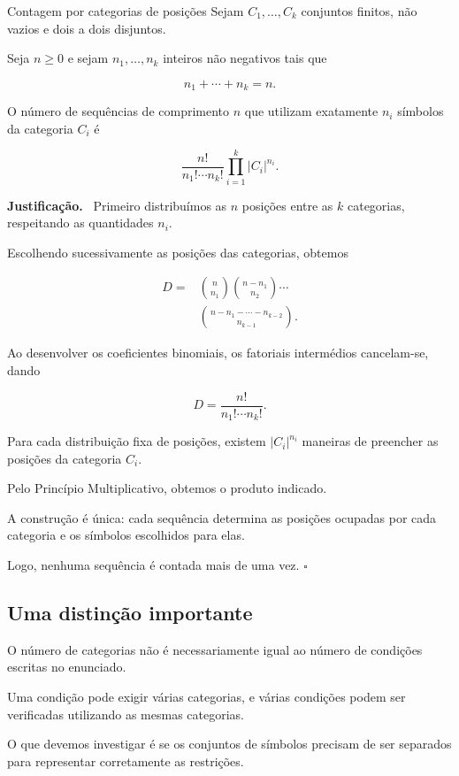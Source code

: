 \documentclass[11pt,a4paper,oneside]{book}
\newcommand{\prova}{\textbf{Justificação.}\ }
\newcommand{\fimprova}{\hfill$\square$}
\newcommand{\card}[1]{\lvert #1\rvert}
\begin{document}
\begin{teoremabox}{Contagem por categorias de posições}
Sejam $C_1,\ldots,C_k$
conjuntos finitos, não vazios
e dois a dois disjuntos.

Seja $n\geq0$ e sejam
$n_1,\ldots,n_k$ inteiros
não negativos tais que

\[
n_1+\cdots+n_k=n.
\]

O número de sequências
de comprimento $n$
que utilizam exatamente $n_i$
símbolos da categoria $C_i$
é

\[
\boxed{
\frac{n!}{n_1!\cdots n_k!}
\prod_{i=1}^{k}\card{C_i}^{n_i}
}.
\]

\prova
Primeiro distribuímos as $n$
posições entre as $k$
categorias, respeitando
as quantidades $n_i$.

Escolhendo sucessivamente
as posições das categorias,
obtemos

\[
\begin{aligned}
D={}&
\binom{n}{n_1}
\binom{n-n_1}{n_2}\cdots\\
&\binom{n-n_1-\cdots-n_{k-2}}{n_{k-1}}.
\end{aligned}
\]

Ao desenvolver os coeficientes
binomiais, os fatoriais
intermédios cancelam-se,
dando

\[
D=\frac{n!}{n_1!\cdots n_k!}.
\]

Para cada distribuição fixa
de posições, existem
$\card{C_i}^{n_i}$
maneiras de preencher
as posições da categoria $C_i$.

Pelo Princípio Multiplicativo,
obtemos o produto indicado.

A construção é única:
cada sequência determina
as posições ocupadas
por cada categoria e os
símbolos escolhidos para elas.

Logo, nenhuma sequência
é contada mais de uma vez.
\fimprova
\end{teoremabox}

\subsection*{Uma distinção importante}

O número de categorias
não é necessariamente igual
ao número de condições escritas
no enunciado.

Uma condição pode exigir
várias categorias,
e várias condições podem
ser verificadas utilizando
as mesmas categorias.

O que devemos investigar
é se os conjuntos de símbolos
precisam de ser separados
para representar corretamente
as restrições.
\end{document}
